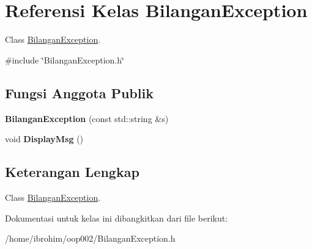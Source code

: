\hypertarget{classBilanganException}{}\section{Referensi Kelas Bilangan\+Exception}
\label{classBilanganException}


Class \hyperlink{classBilanganException}{Bilangan\+Exception}.  




{\ttfamily \#include \char`\"{}Bilangan\+Exception.\+h\char`\"{}}

\subsection*{Fungsi Anggota Publik}
\begin{DoxyCompactItemize}
\item 
\hypertarget{classBilanganException_a2e445b82800961735dcee2a87cb15f5a}{}{\bfseries Bilangan\+Exception} (const std\+::string \&s)\label{classBilanganException_a2e445b82800961735dcee2a87cb15f5a}

\item 
\hypertarget{classBilanganException_a9f24c7a2b988f6269014f202b7ea2226}{}void {\bfseries Display\+Msg} ()\label{classBilanganException_a9f24c7a2b988f6269014f202b7ea2226}

\end{DoxyCompactItemize}


\subsection{Keterangan Lengkap}
Class \hyperlink{classBilanganException}{Bilangan\+Exception}. 

Dokumentasi untuk kelas ini dibangkitkan dari file berikut\+:\begin{DoxyCompactItemize}
\item 
/home/ibrohim/oop002/Bilangan\+Exception.\+h\end{DoxyCompactItemize}
